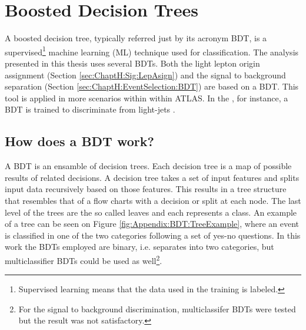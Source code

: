 \chapter{Boosted Decision Trees}
\label{chap:Appendix:BDT}



A boosted decision tree, typically referred just by its acronym BDT, is a supervised\footnote{Supervised learning means that the 
data used in the training is labeled.} machine learning (ML) technique used for classification. The analysis presented in this thesis 
uses several BDTs. Both the light lepton origin assignment (Section \ref{sec:ChaptH:Sig:LepAsign}) and the signal to background 
separation (Section \ref{sec:ChaptH:EventSelection:BDT}) are based on a BDT. This tool is applied in more scenarios within 
within ATLAS. In the \btag, for instance, a BDT is trained to discriminate \bjets from light-jets \cite{Connelly:2017wlp}. 




\section{How does a BDT work?}
A BDT is an ensamble of decision trees. Each decision tree is a map of possible results of related decisions. 
A decision tree takes a set of input features and splits input data recursively based on those features. 
This results in a tree structure that resembles that of a flow charts with a decision or split at each node.
The last level of the trees are the so called leaves and each represents a class.
An example of a tree can be seen on Figure \ref{fig:Appendix:BDT:TreeExample}, where an event is classified in one of the two 
categories following a set of yes-no questions. In this work the BDTs employed are binary, i.e. separates into two categories, 
but multiclassifier BDTs could be used as well\footnote{For the signal to background discrimination, multiclassifer BDTs were
tested but the result was not satisfactory.}.


